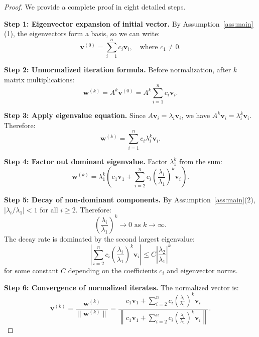 \documentclass[11pt,a4paper]{article}
\begin{document}
\begin{proof}
We provide a complete proof in eight detailed steps.

\textbf{Step 1: Eigenvector expansion of initial vector.}
By Assumption~\ref{ass:main}(1), the eigenvectors form a basis, so we can write:
\begin{equation}
\mathbf{v}^{(0)} = \sum_{i=1}^n c_i \mathbf{v}_i, \quad \text{where } c_1 \neq 0.
\end{equation}

\textbf{Step 2: Unnormalized iteration formula.}
Before normalization, after $k$ matrix multiplications:
\begin{equation}
\mathbf{w}^{(k)} = A^k \mathbf{v}^{(0)} = A^k \sum_{i=1}^n c_i \mathbf{v}_i.
\end{equation}

\textbf{Step 3: Apply eigenvalue equation.}
Since $A\mathbf{v}_i = \lambda_i \mathbf{v}_i$, we have $A^k\mathbf{v}_i = \lambda_i^k \mathbf{v}_i$. Therefore:
\begin{equation}
\mathbf{w}^{(k)} = \sum_{i=1}^n c_i \lambda_i^k \mathbf{v}_i.
\end{equation}

\textbf{Step 4: Factor out dominant eigenvalue.}
Factor $\lambda_1^k$ from the sum:
\begin{equation}
\mathbf{w}^{(k)} = \lambda_1^k \left( c_1 \mathbf{v}_1 + \sum_{i=2}^n c_i \left(\frac{\lambda_i}{\lambda_1}\right)^k \mathbf{v}_i \right).
\end{equation}

\textbf{Step 5: Decay of non-dominant components.}
By Assumption~\ref{ass:main}(2), $|\lambda_i/\lambda_1| < 1$ for all $i \geq 2$. Therefore:
\begin{equation}
\left(\frac{\lambda_i}{\lambda_1}\right)^k \to 0 \text{ as } k \to \infty.
\end{equation}
The decay rate is dominated by the second largest eigenvalue:
\begin{equation}
\left|\sum_{i=2}^n c_i \left(\frac{\lambda_i}{\lambda_1}\right)^k \mathbf{v}_i\right| \leq C \left|\frac{\lambda_2}{\lambda_1}\right|^k
\end{equation}
for some constant $C$ depending on the coefficients $c_i$ and eigenvector norms.

\textbf{Step 6: Convergence of normalized iterates.}
The normalized vector is:
\begin{equation}
\mathbf{v}^{(k)} = \frac{\mathbf{w}^{(k)}}{\|\mathbf{w}^{(k)}\|} = \frac{c_1 \mathbf{v}_1 + \sum_{i=2}^n c_i \left(\frac{\lambda_i}{\lambda_1}\right)^k \mathbf{v}_i}{\left\|c_1 \mathbf{v}_1 + \sum_{i=2}^n c_i \left(\frac{\lambda_i}{\lambda_1}\right)^k \mathbf{v}_i\right\|}.
\end{equation}


\end{proof}
\end{document}
